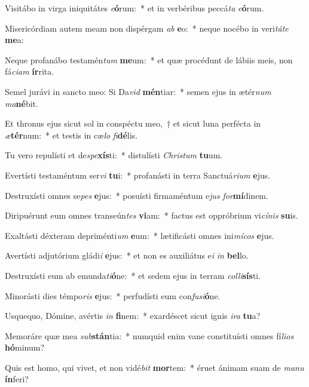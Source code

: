 \item Visitábo in virga iniquitátes \textit{e}\textbf{ó}rum:~* et in verbéribus peccá\textit{ta} \textit{e}\textbf{ó}rum.
\item Misericórdiam autem meam non dispérgam \textit{ab} \textbf{e}o:~* neque nocébo in veri\textit{tá}\textit{te} \textbf{me}a:
\item Neque profanábo testamén\textit{tum} \textbf{me}um:~* et quæ procédunt de lábiis meis, non fá\textit{ci}\textit{am} \textbf{ír}rita.
\item Semel jurávi in sancto meo: Si Da\textit{vid} \textbf{mén}tiar:~* semen ejus in ætér\textit{num} \textit{ma}\textbf{né}bit.
\item Et thronus ejus sicut sol in conspéctu meo,~† et sicut luna perfécta in \textit{æ}\textbf{tér}num:~* et testis in cæ\textit{lo} \textit{fi}\textbf{dé}lis.
\item Tu vero repulísti et de\textit{spe}\textbf{xís}ti:~* distulísti \textit{Chris}\textit{tum} \textbf{tu}um.
\item Evertísti testaméntum ser\textit{vi} \textbf{tu}i:~* profanásti in terra Sanctuá\textit{ri}\textit{um} \textbf{e}jus.
\item Destruxísti omnes se\textit{pes} \textbf{e}jus:~* posuísti firmaméntum e\textit{jus} \textit{for}\textbf{mí}dinem.
\item Diripuérunt eum omnes transeún\textit{tes} \textbf{vi}am:~* factus est oppróbrium vi\textit{cí}\textit{nis} \textbf{su}is.
\item Exaltásti déxteram depriménti\textit{um} \textbf{e}um:~* lætificásti omnes ini\textit{mí}\textit{cos} \textbf{e}jus.
\item Avertísti adjutórium gládi\textit{i} \textbf{e}jus:~* et non es auxiliátus e\textit{i} \textit{in} \textbf{bel}lo.
\item Destruxísti eum ab emunda\textit{ti}\textbf{ó}ne:~* et sedem ejus in terram \textit{col}\textit{li}\textbf{sís}ti.
\item Minorásti dies témpo\textit{ris} \textbf{e}jus:~* perfudísti eum con\textit{fu}\textit{si}\textbf{ó}ne.
\item Usquequo, Dómine, avértis \textit{in} \textbf{fi}nem:~* exardéscet sicut ignis \textit{i}\textit{ra} \textbf{tu}a?
\item Memoráre quæ mea \textit{sub}\textbf{stán}tia:~* numquid enim vane constituísti omnes fí\textit{li}\textit{os} \textbf{hó}minum?
\item Quis est homo, qui vivet, et non vidé\textit{bit} \textbf{mor}tem:~* éruet ánimam suam de \textit{ma}\textit{nu} \textbf{ín}feri?
